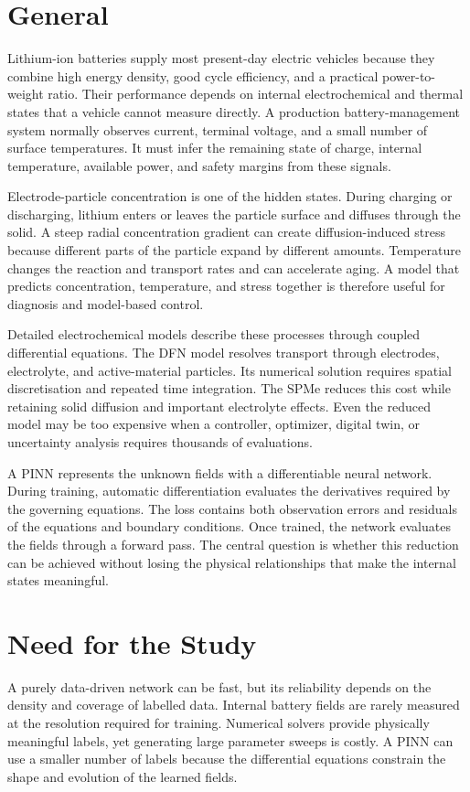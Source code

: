 \documentclass[14pt,a4paper,oneside]{extreport}
\begin{document}
\section{General}
Lithium-ion batteries supply most present-day electric vehicles because they combine high energy density, good cycle efficiency, and a practical power-to-weight ratio. Their performance depends on internal electrochemical and thermal states that a vehicle cannot measure directly. A production battery-management system normally observes current, terminal voltage, and a small number of surface temperatures. It must infer the remaining state of charge, internal temperature, available power, and safety margins from these signals.

Electrode-particle concentration is one of the hidden states. During charging or discharging, lithium enters or leaves the particle surface and diffuses through the solid. A steep radial concentration gradient can create diffusion-induced stress because different parts of the particle expand by different amounts. Temperature changes the reaction and transport rates and can accelerate aging. A model that predicts concentration, temperature, and stress together is therefore useful for diagnosis and model-based control.

Detailed electrochemical models describe these processes through coupled differential equations. The DFN model resolves transport through electrodes, electrolyte, and active-material particles. Its numerical solution requires spatial discretisation and repeated time integration. The SPMe reduces this cost while retaining solid diffusion and important electrolyte effects. Even the reduced model may be too expensive when a controller, optimizer, digital twin, or uncertainty analysis requires thousands of evaluations.

A PINN represents the unknown fields with a differentiable neural network. During training, automatic differentiation evaluates the derivatives required by the governing equations. The loss contains both observation errors and residuals of the equations and boundary conditions. Once trained, the network evaluates the fields through a forward pass. The central question is whether this reduction can be achieved without losing the physical relationships that make the internal states meaningful.

\section{Need for the Study}
A purely data-driven network can be fast, but its reliability depends on the density and coverage of labelled data. Internal battery fields are rarely measured at the resolution required for training. Numerical solvers provide physically meaningful labels, yet generating large parameter sweeps is costly. A PINN can use a smaller number of labels because the differential equations constrain the shape and evolution of the learned fields.
\end{document}
